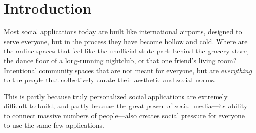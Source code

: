 \section{Introduction}

Most social applications today are built like international airports,
designed to serve everyone, but in the process they have become hollow and cold.
Where are the online spaces that feel like
the unofficial skate park behind the grocery store,
the dance floor of a long-running nightclub,
or that one friend's living room?
Intentional community spaces that are not meant for everyone,
but are \emph{everything} to the people
that collectively curate their aesthetic and social norms.

This is partly because truly personalized social
applications are extremely difficult to build,
and partly because the great power of social media---its
ability to connect massive numbers of people---also
creates social pressure for everyone to use the same few applications.








